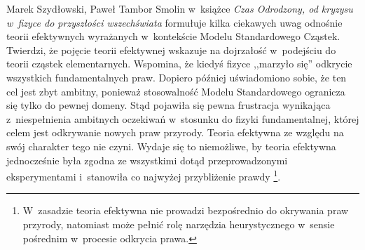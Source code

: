 \begin{artplenv2auth}{Marek Szydłowski, Paweł Tambor}
Smolin w~książce \textit{Czas Odrodzony, od kryzysu w~fizyce do przyszłości wszechświata}
\parencite*[][]{smolin_czas_2015} %
 formułuje kilka ciekawych uwag odnośnie teorii efektywnych wyrażanych w~kontekście Modelu Standardowego Cząstek. Twierdzi, że pojęcie teorii efektywnej wskazuje na dojrzałość w~podejściu do teorii cząstek elementarnych. Wspomina, że kiedyś fizyce ,,marzyło się'' odkrycie wszystkich fundamentalnych praw. Dopiero później uświadomiono sobie, że ten cel jest zbyt ambitny, ponieważ stosowalność Modelu Standardowego ogranicza się tylko do pewnej domeny. Stąd pojawiła się pewna frustracja wynikająca z~niespełnienia ambitnych oczekiwań w~stosunku do fizyki fundamentalnej, której celem jest odkrywanie nowych praw przyrody. Teoria efektywna ze względu na swój charakter tego nie czyni. Wydaje się to niemożliwe, by teoria efektywna jednocześnie była zgodna ze wszystkimi dotąd przeprowadzonymi eksperymentami i~stanowiła co najwyżej przybliżenie prawdy 
\parencite[][s.~165]{smolin_czas_2015}%
\footnote{W~zasadzie teoria efektywna nie prowadzi bezpośrednio do okrywania praw przyrody, natomiast może pełnić rolę narzędzia heurystycznego w~sensie pośrednim w~procesie odkrycia prawa.}.


\end{artplenv2auth}
